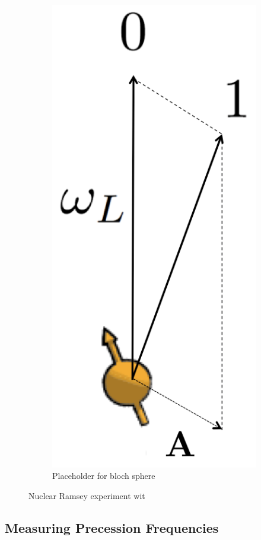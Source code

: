 \begin{figure}[htbp]
\begin{subfigure}[t]{0.32\textwidth}
        \includegraphics[scale=0.2]{Img/QuantizationAxis.png}
        \caption{Placeholder for bloch sphere }
    \end{subfigure}

    \caption{Nuclear Ramsey experiment wit}
    \label{fig:conditional_pm_x_rotation}
\end{figure}



\subsection*{Measuring Precession Frequencies}


